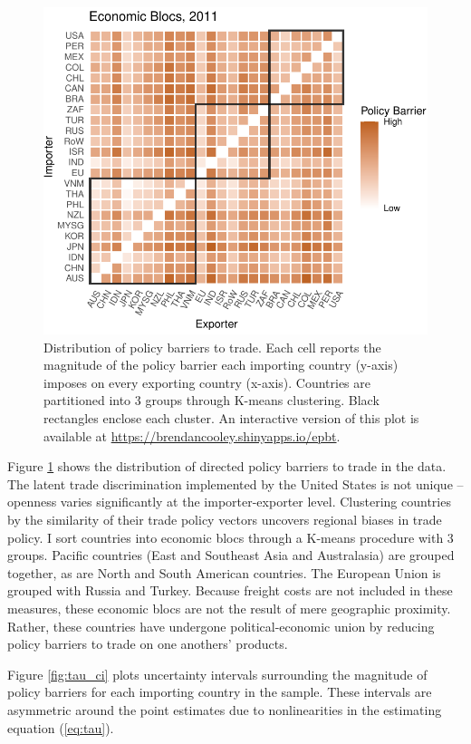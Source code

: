 \documentclass{puthesis}
\begin{document}
\begin{figure}
\centering
\includegraphics{figure/hm-1.pdf}
\caption{Distribution of policy barriers to trade. Each cell reports the
magnitude of the policy barrier each importing country (y-axis) imposes
on every exporting country (x-axis). Countries are partitioned into 3
groups through K-means clustering. Black rectangles enclose each
cluster. An interactive version of this plot is available at
\protect\url{https://brendancooley.shinyapps.io/epbt}. \label{fig:hm}}
\end{figure}

Figure \ref{fig:hm} shows the distribution of directed policy barriers
to trade in the data. The latent trade discrimination implemented by the
United States is not unique -- openness varies significantly at the
importer-exporter level. Clustering countries by the similarity of their
trade policy vectors uncovers regional biases in trade policy. I sort
countries into economic blocs through a K-means procedure with 3 groups.
Pacific countries (East and Southeast Asia and Australasia) are grouped
together, as are North and South American countries. The European Union
is grouped with Russia and Turkey. Because freight costs are not
included in these measures, these economic blocs are not the result of
mere geographic proximity. Rather, these countries have undergone
political-economic union by reducing policy barriers to trade on one
anothers' products.

Figure \ref{fig:tau_ci} plots uncertainty intervals surrounding the
magnitude of policy barriers for each importing country in the sample.
These intervals are asymmetric around the point estimates due to
nonlinearities in the estimating equation (\ref{eq:tau}).
\end{document}

